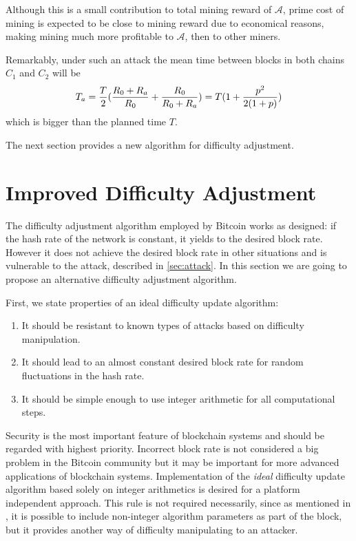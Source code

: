 \documentclass[]{llncs}
\newcommand{\coinA}{$C_1$}
\newcommand{\coinB}{$C_2$}
\begin{document}
Although this is a small contribution to total mining reward of $\mathcal{A}$, prime cost of mining is expected to be close to mining reward due to economical reasons, making mining much more profitable to $\mathcal{A}$, then to other miners.

Remarkably, under such an attack the mean time between blocks in both chains \coinA{} and \coinB{} will be
\begin{equation}
\label{eq:ati}
{T_a={T\over 2}({R_0+R_a\over R_0} + {R_0 \over R_0+R_a}) = T(1 + {p^2\over 2(1+p)})}
\end{equation}
which is bigger than the planned time $T$.


The next section provides a new algorithm for difficulty adjustment.

\section{Improved Difficulty Adjustment}
\label{sec:improved}

The difficulty adjustment algorithm employed by Bitcoin works as designed: if the hash rate of the network is constant, it yields to the desired block rate. However it does not achieve the desired block rate in other situations and is vulnerable to the attack, described in \ref{sec:attack}.
In this section we are going to propose an alternative difficulty adjustment algorithm.

First, we state properties of an ideal difficulty update algorithm:
\begin{enumerate}
\item{It should be resistant to known types of attacks based on difficulty manipulation.}
\item{It should lead to an almost constant desired block rate for random fluctuations in the hash rate.}
\item{It should be simple enough to use integer arithmetic for all computational steps.}
\end{enumerate}

Security is the most important feature of blockchain systems and should be regarded with highest priority.
Incorrect block rate is not considered a big problem in the Bitcoin community but it may be important for more advanced applications of blockchain systems.
Implementation of the \textit{ideal} difficulty update algorithm based solely on integer arithmetics is desired for a platform independent approach.
This rule is not required necessarily, since as mentioned in \cite{kraft2015difficulty}, it is possible to include non-integer algorithm parameters as part of the block, but it provides another way of difficulty manipulating to an attacker.
\end{document}
